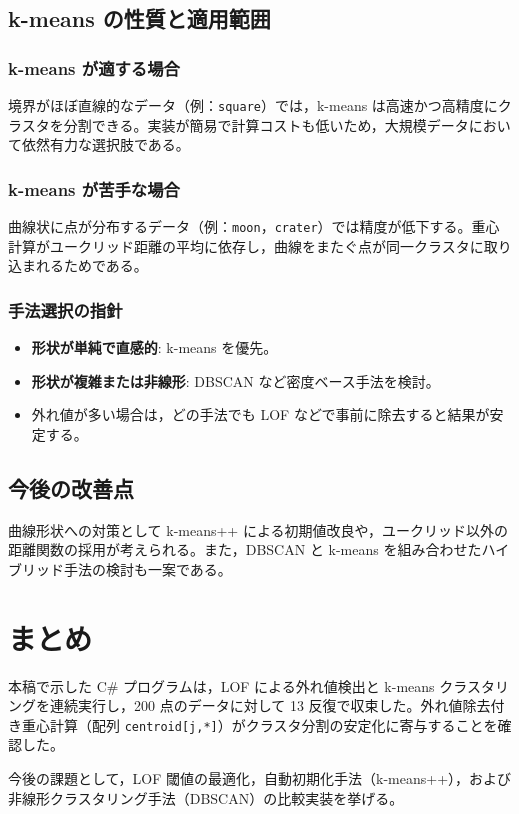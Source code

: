\documentclass[a4j,dvipdfmx]{jsarticle}
\begin{document}
\subsection{k-means の性質と適用範囲}
\subsubsection{k-means が適する場合}
境界がほぼ直線的なデータ（例：\texttt{square}）では，k-means は高速かつ高精度にクラスタを分割できる。実装が簡易で計算コストも低いため，大規模データにおいて依然有力な選択肢である。

\subsubsection{k-means が苦手な場合}
曲線状に点が分布するデータ（例：\texttt{moon}，\texttt{crater}）では精度が低下する。重心計算がユークリッド距離の平均に依存し，曲線をまたぐ点が同一クラスタに取り込まれるためである。

\subsubsection{手法選択の指針}
\begin{itemize}
  \item \textbf{形状が単純で直感的}: k-means を優先。
  \item \textbf{形状が複雑または非線形}: DBSCAN など密度ベース手法を検討。
  \item 外れ値が多い場合は，どの手法でも LOF などで事前に除去すると結果が安定する。
\end{itemize}

\subsection{今後の改善点}
曲線形状への対策として k-means++ による初期値改良や，ユークリッド以外の距離関数の採用が考えられる。また，DBSCAN と k-means を組み合わせたハイブリッド手法の検討も一案である。

\section{まとめ}
本稿で示した C\# プログラムは，LOF による外れ値検出と k-means クラスタリングを連続実行し，200 点のデータに対して 13 反復で収束した。外れ値除去付き重心計算（配列 \texttt{centroid[j,*]}）がクラスタ分割の安定化に寄与することを確認した。

今後の課題として，LOF 閾値の最適化，自動初期化手法（k-means++），および非線形クラスタリング手法（DBSCAN）の比較実装を挙げる。
\end{document}
